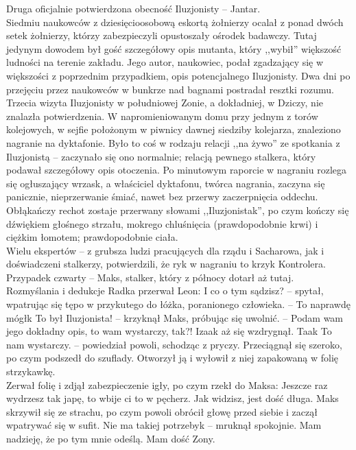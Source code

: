 \documentclass[../MAIN.tex]{subfiles}
\begin{document}
Druga oficjalnie potwierdzona obecność Iluzjonisty -- Jantar.\\
Siedmiu naukowców z dziesięcioosobową eskortą żołnierzy ocalał z ponad dwóch setek żołnierzy, którzy zabezpieczyli opustoszały ośrodek badawczy. Tutaj jedynym dowodem był gość szczegółowy opis mutanta, który ,,wybił'' większość ludności na terenie zakładu. Jego autor, naukowiec, podał zgadzający się w większości z poprzednim przypadkiem, opis potencjalnego Iluzjonisty. Dwa dni po przejęciu przez naukowców w bunkrze nad bagnami postradał resztki rozumu.\\
Trzecia wizyta Iluzjonisty w południowej Zonie, a dokładniej, w Dziczy, nie znalazła potwierdzenia. W napromieniowanym domu przy jednym z torów kolejowych, w sejfie położonym w piwnicy dawnej siedziby kolejarza, znaleziono nagranie na dyktafonie. Było to coś w rodzaju relacji ,,na żywo'' ze spotkania z Iluzjonistą -- zaczynało się ono normalnie; relacją pewnego stalkera, który podawał szczegółowy opis otoczenia. Po minutowym raporcie w nagraniu rozlega się ogłuszający wrzask, a właściciel dyktafonu, twórca nagrania, zaczyna się panicznie, nieprzerwanie śmiać, nawet bez przerwy zaczerpnięcia oddechu. Obłąkańczy rechot zostaje przerwany słowami ,,Iluzjonista\3k'', po czym kończy się dźwiękiem głośnego strzału, mokrego chluśnięcia (prawdopodobnie krwi) i ciężkim łomotem; prawdopodobnie ciała.\\
Wielu ekspertów -- z grubsza ludzi pracujących dla rządu i Sacharowa, jak i doświadczeni stalkerzy, potwierdzili, że ryk w nagraniu to krzyk Kontrolera.\\
Przypadek czwarty -- Maks, stalker, który z północy dotarł aż tutaj.\\
Rozmyślania i dedukcje Radka przerwał Leon:
\sx I co o tym sądzisz? -- spytał, wpatrując się tępo w przykutego do łóżka, poranionego człowieka. -- To naprawdę mógł\3k
\xx To był Iluzjonista! -- krzyknął Maks, próbując się uwolnić. -- Podam wam jego dokładny opis, to wam wystarczy, tak?!
\qd
Izaak aż się wzdrygnął.
\sx Taa\3k To nam wystarczy. -- powiedział powoli, schodząc z pryczy.
\qd
Przeciągnął się szeroko, po czym podszedł do szuflady. Otworzył ją i wyłowił z niej zapakowaną w folię strzykawkę.\\
Zerwał folię i zdjął zabezpieczenie igły, po czym rzekł do Maksa:
\sx Jeszcze raz wydrzesz tak japę, to wbije ci to w pęcherz. Jak widzisz, jest dość długa.
\qd
Maks skrzywił się ze strachu, po czym powoli obrócił głowę przed siebie i zaczął wpatrywać się w sufit.
\sx Nie ma takiej potrzeby\3k -- mruknął spokojnie. Mam nadzieję, że po tym mnie odeślą. Mam dość Zony.
\end{document}

